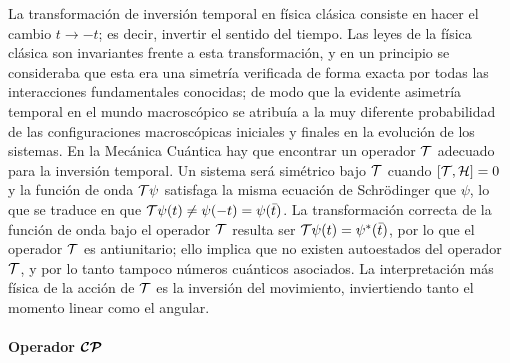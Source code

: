La transformación de inversión temporal en física clásica consiste en hacer el cambio $ t \rightarrow - t$; es decir, invertir el sentido del tiempo. Las leyes de la física clásica son  invariantes frente a esta transformación, y en un principio se consideraba que esta era una  simetría verificada de forma exacta por todas las interacciones fundamentales conocidas; de modo que la evidente asimetría temporal en el mundo  macroscópico se atribuía a la muy diferente probabilidad de las configuraciones  macroscópicas iniciales y finales en la evolución de los sistemas. 
%
En la Mecánica  Cuántica hay que encontrar un operador $\mathcal{T}$ adecuado para la inversión temporal. Un sistema será simétrico bajo $\mathcal{T}$ cuando $[ \mathcal{T}, \mathcal{ H}] = 0$ y la función de onda $\mathcal{T} \psi$ satisfaga la misma ecuación de  Schrödinger que $\psi$, lo que se traduce en que $\mathcal{T} \psi ( t) \neq \psi (- t) = \psi (\bar{ t})$.
%
La transformación correcta de la función de onda bajo el operador $\mathcal{T}$ resulta ser $\mathcal{T} \psi ( t) = \psi^* (\bar{ t})$, por lo que el operador $\mathcal{T}$ es  antiunitario; ello implica que no existen  autoestados del operador $\mathcal{T}$, y por lo tanto tampoco números  cuánticos asociados.
%
La interpretación más física de la acción de $\mathcal{T}$ es la inversión del movimiento, inviertiendo tanto el momento  linear como el angular.



\paragraph{Operador $\bm{\mathcal{CP}}$}


